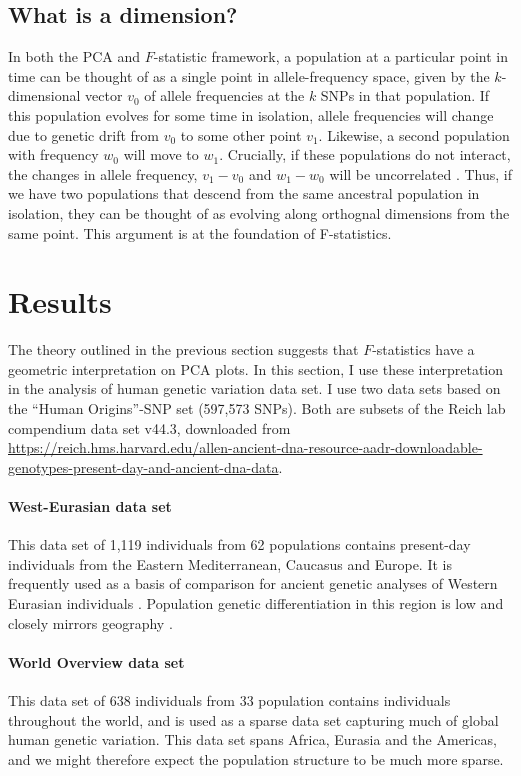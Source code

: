 \documentclass[12pt,a4pape, fullpage]{article}
\begin{document}
	\subsection{What is a dimension?}
	In both the PCA and $F$-statistic framework, a population at  a particular point in time can be thought of as a single point in allele-frequency space, given by the $k$-dimensional vector $v_0$ of allele frequencies at the $k$ SNPs in that population. If this population evolves for some time in isolation, allele frequencies will change due to genetic drift from $v_0$ to some other point $v_1$. Likewise, a second population with frequency $w_0$ will move to $w_1$. Crucially, if these populations do not interact, the changes in allele frequency, $v_1 - v_0$ and $w_1 - w_0$ will be uncorrelated \citep{patterson2012}. Thus, if we have two populations that descend from the same ancestral population in isolation, they can be thought of as evolving along orthognal dimensions from the same point. This argument is at the foundation of F-statistics.
	
	

\section{Results}
The theory outlined in the previous section suggests that $F$-statistics have a geometric interpretation on PCA plots. In this section, I use these interpretation in the analysis of human genetic variation data set. I use two data sets based on the ``Human Origins''-SNP set (597,573 SNPs). Both are subsets of the Reich lab compendium data set v44.3, downloaded from \url{https://reich.hms.harvard.edu/allen-ancient-dna-resource-aadr-downloadable-genotypes-present-day-and-ancient-dna-data}. 

\paragraph{West-Eurasian data set}
This data set of 1,119 individuals from 62 populations contains  present-day individuals from the Eastern Mediterranean, Caucasus and Europe. It is frequently used as a basis of comparison for ancient genetic analyses of Western Eurasian individuals \citep{patterson2012}. Population genetic differentiation in this region is low and closely mirrors geography \citep{novembre2008}. 

\paragraph{World Overview data set}
This data set of 638 individuals from 33 population contains individuals throughout the world, and is used as a sparse data set capturing much of global human genetic variation. This data set spans Africa, Eurasia and the Americas, and we might therefore expect the population structure to be much more sparse.
\end{document}
